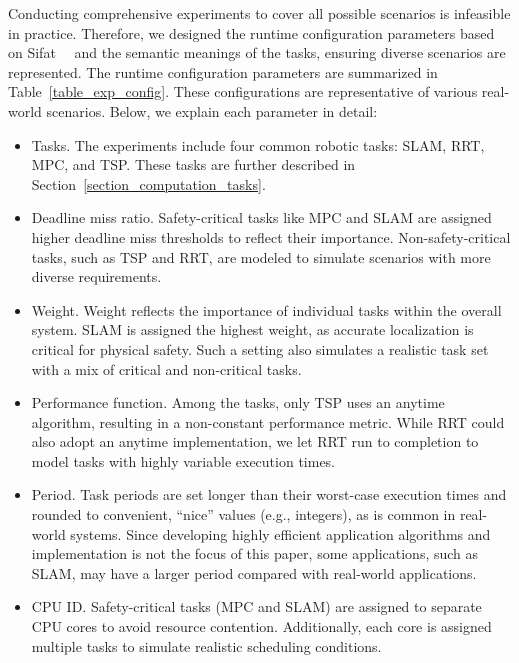	Conducting comprehensive experiments to cover all possible scenarios is infeasible in practice. Therefore, we designed the runtime configuration parameters based on Sifat~\etal~\cite{Ash23RAL} and the semantic meanings of the tasks, ensuring diverse scenarios are represented. The runtime configuration parameters are summarized in Table~\ref{table_exp_config}. These configurations are representative of various real-world scenarios. Below, we explain each parameter in detail:
    \begin{itemize}
        \item Tasks. The experiments include four common robotic tasks: SLAM, RRT, MPC, and TSP. These tasks are further described in Section~\ref{section_computation_tasks}.
    
        \item Deadline miss ratio. Safety-critical tasks like MPC and SLAM are assigned higher deadline miss thresholds to reflect their importance. Non-safety-critical tasks, such as TSP and RRT, are modeled to simulate scenarios with more diverse requirements.
    
        \item Weight. Weight reflects the importance of individual tasks within the overall system. SLAM is assigned the highest weight, as accurate localization is critical for physical safety. Such a setting also simulates a realistic task set with a mix of critical and non-critical tasks.
        \item Performance function. Among the tasks, only TSP uses an anytime algorithm, resulting in a non-constant performance metric. While RRT could also adopt an anytime implementation, we let RRT run to completion to model tasks with highly variable execution times.
        \item Period. Task periods are set longer than their worst-case execution times and rounded to convenient, “nice” values (e.g., integers), as is common in real-world systems. 
        Since developing highly efficient application algorithms and implementation is not the focus of this paper, some applications, such as SLAM, may have a larger period compared with real-world applications.
        \item CPU ID. Safety-critical tasks (MPC and SLAM) are assigned to separate CPU cores to avoid resource contention. Additionally, each core is assigned multiple tasks to simulate realistic scheduling conditions.
    \end{itemize}
    
